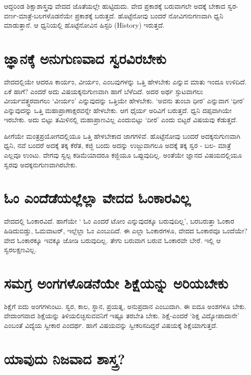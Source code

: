 ಆದ್ದರಿಂಡ ಶಿಕ್ಷಾಶಾಸ್ತ್ರವು ವೇದದ ಜೊತೆಯಲ್ಲೇ ಹುಟ್ಟಿದುದು. ವೇದ ಪ್ರಕಾಶಕ್ಕೆ  ಬರುವಾಗಲೇ ಅದಕ್ಕೆ ಬೇಕಾದ ಸ್ವರ-ವರ್ಣ-ಮಾತ್ರೆ-ಬಲಗಳೊಡನೆಯೇ ಪ್ರಕಾಶಕ್ಕೆ ಬರುತ್ತದೆ. ಹೊಟ್ಟೆನೋವು ಬಂದರೆ ನೋವಿಗನುಗಣವಾಗಿ ಧ್ವನಿ ಮಾಡುತ್ತಾನೆ. ಆ ಧ್ವನಿಯಲ್ಲಿ ಹೊಟ್ಟೆನೋವಿನ ಹಿಸ್ಟರಿ (History) ಇರುತ್ತದೆ.

\section*{ಜ್ಞಾನಕ್ಕೆ ಅನುಗುಣವಾದ ಸ್ವರವಿರಬೇಕು}

ವೇದದಲ್ಲಿಯೇ ಆದರೂ ಕಾರ್ಯಂ, ವೀರ್ಯಂ, ಎಂಬವುಗಳನ್ನು ಒತ್ತಿ ಹೇಳಬೇಕು ಎನ್ನುವ ಮಾತು ಇಂದೂ ಉಳಿದಿದೆ. ಏಕೆ ಹಾಗೆ? ಎಂದರೆ ಅದು ವಿಷಯಕ್ಕನುಗುಣವಾಗಿ ಹಾಗೆ ಬೆಳೆದಿದೆ. ಅದರ ಅರ್ಥ ಸ್ಫುಟವಾಗಲು ವೀರ್ಯವತ್ತ್ತರವಾಗಲು `ವೀರ್ಯಂ' ಎನ್ನುವುದನ್ನು  ಒತ್ತಿಯೇ ಹೇಳಬೇಕು. `ಅವನು ತುಂಬಾ ಧೀರ' ಎನ್ನುವಾಗ `ಧೀರ' ಎನ್ನುವುದನ್ನು ಒತ್ತಿ ಮಹಾಪ್ರಾಣಾಕ್ಷರವನ್ನೇ ಹೇಳಬೇಕು. ಆಗ ಧೈರ್ಯ ಅರಿವಿಗೆ ಬರುತ್ತದೆ. ಧ್ವನಿ ದಪ್ಪವಾಗಿಯೇ ಇರಬೇಕು. ಅದು ಬಿಟ್ಟು ತಮಿಳಿನಲ್ಲಿ ಮಹಾಪ್ರಾಣವಿಲ್ಲ ಎಂದುಬಿಟ್ಟು `ದೀರ' ಎಂದು ಬಿಟ್ಟರೆ ವಿಷಯವು ಕೆಡುತ್ತದೆ.

ಹೀಗೆಯೇ ಮಂತ್ರಪ್ರಯೋಗದಲ್ಲಿಯೂ ಒತ್ತಿ ಹೇಳಬೇಕಾದ ಜಾಗಗಳಿವೆ. ಹೊಟ್ಟೆನೋವು ಬಂದರೆ ಅದಕ್ಕನುಗುಣವಾಗಿ ಧ್ವನಿ, ನವೆ ಬಂದರೆ ಅದಕ್ಕೆ ತಕ್ಕ ಕೆರೆತ, ಕಜ್ಜಿ  ಬಂದು ಅದನ್ನು ಉಜ್ಜುವಾಗಲೂ ಅದಕ್ಕೆ ತಕ್ಕ ಸ್ವರ - ಬಲ- ಮಾತ್ರೆ ಎಲ್ಲವೂ ಉಂಟು. ವೇಗವು ಸ್ವಲ್ಪ ಕಡಿಮೆಯಾದರೂ ಕಜ್ಜಿಯೂ ಒಪ್ಪುವುದಿಲ್ಲ. ಅಂತೆಯೇ ಜ್ಞಾನದ ವಿಷಯದಲ್ಲಿಯೂ ಸ್ವರವು ಅದಕ್ಕನುಗುಣವಾಗಿರಬೇಕು.

\section*{ಓಂ ಎಂದೆಡೆಯಲ್ಲೆಲ್ಲಾ ವೇದದ ಓಂಕಾರವಿಲ್ಲ}

ವೇದದಲ್ಲಿ ಓಂಕಾರವಿದೆ. ಹಾಗೆಯೇ ` ಓಂ ಎಂದರೆ ಟೋಂ ಎನ್ನುವುದಕ್ಕೂ ಬರುವುದಿಲ್ಲ', ಬರಬರುತ್ತಾ ಓಂಕಾರ ಹಿಡಿದುಬಿಡ್ತು, ಓಮವಾಟರ್, ಇಲ್ಲೆಲ್ಲಾ ಓಂ ಎಂಬುದಿದೆ. ಈ ಎಲ್ಲಾ ಓಂಕಾರಗಳೂ, ವೇದದ ಓಂಕಾರವೂ ಒಂದೆಯೇ? ವೇದ ಓಂಕಾರಕ್ಕೂ ಇವಕ್ಕೂ ಜೋಡಿ ಬರುವುದಿಲ್ಲ. ತೇಗು ಬರುವಾಗ ಬರುವ ಓಂಕಾರವೇ ಬೇರೆ. ಇಲ್ಲಿ ಆ ಸ್ವರಲಕ್ಷಣವಿಲ್ಲ.

\section*{ಸಮಗ್ರ ಅಂಗಗಳೊಡನೆಯೇ ಶಿಕ್ಷೆಯನ್ನು ಅರಿಯಬೇಕು}

ಶಿಕ್ಷೆಗೆ ಐದು ಅಂಗಗಳುಂಟು. ಸ್ವರ, ಕಾಲ, ಸ್ಥಾನ, ಪ್ರಯತ್ನ, ಅನುಪ್ರದಾನ ಎಂಬುದಾಗಿ. ಈ ಐದೂ ಅಂಶಗಳೂ ಬೇಕು. ವೇದಾಂಗವಾದ ಶಿಕ್ಷೆಯನ್ನು ತಿಳಿಯಲಿಚ್ಛಿಸುವವನಿಗೆ ಇಷ್ಟೂ ತರಬೇತಿ ಬೇಕು. ಶಿಕ್ಷೆ-ಎಂದರೆ `ಶಿಕ್ಷ ವಿದ್ಯೋಪಾದಾನೇ' ಎಂಬಂತೆ ವಿದ್ಯೆಯ ಸ್ವೀಕಾರ ಎಂದರ್ಥ. ಹಾಗೆ ವಿಷಯವನ್ನು ಸ್ವೀಕರಿಸದಿದ್ದರೆ ವಿಷಯಕ್ಕೆ ಶಿಕ್ಷೆಯಾಗುತ್ತದೆ.

\section*{ಯಾವುದು ನಿಜವಾದ ಶಾಸ್ತ್ರ?}

